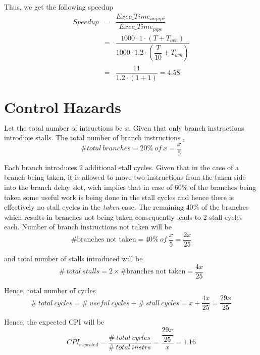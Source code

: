 \documentclass{tufte-handout}
\begin{document}
	Thus, we get the following speedup
	\begin{eqnarray*}
		Speedup &=& \dfrac{Exec\_Time_{unpipe}}{Exec\_Time_{pipe}} \\
		&=& \dfrac{1000 \cdot 1 \cdot (T + T_{ovh})}{1000 \cdot 1.2 \cdot (\dfrac{T}{10} + T_{ovh})} \\
		&=& \dfrac{11}{1.2 \cdot (1 + 1)} = \mathbf{4.58}
	\end{eqnarray*}

  \section{$\textbf{Control Hazards}$}
  Let the total number of intructions be $x$. Given that only branch instructions introduce stalls.
  The total number of branch instructions ,
  \[
  	\# total\ branches = 20\%\ of\ x = \dfrac{x}{5}
  \]

  Each branch introduces 2 additional stall cycles. Given that in the case of a branch being taken, it is allowed to move two instructions from the taken side into the branch delay slot, wich implies that in case of $60\%$ of the branches being taken some useful work is being done in the stall cycles and hence there is effectively no stall cycles in the \emph{taken} case. The remaining $40\%$ of the branches which results in branches not being taken consequently leads to 2 stall cycles each. 
  Number of branch instructions not taken will be
  \[
  	\mbox{\# branches not taken} = 40\%\ of\ \dfrac{x}{5} = \dfrac{2x}{25}
  \]

  and total number of stalls introduced will be
  \[
  	\#\ total\ stalls = 2 \times \mbox{\# branches not taken} = \dfrac{4x}{25}
  \]

  Hence, total number of cycles
  \[
  	 \#\ total\ cycles = \#\ useful\ cycles + \#\ stall\ cycles = x + \dfrac{4x}{25} = \dfrac{29x}{25}
  \]

  Hence, the expected CPI will be
  \[
  	CPI_{expected} = \dfrac{\#\ total\ cycles}{\#\ total\ instrs} = \dfrac{\dfrac{29x}{25}}{x} = \mathbf{1.16}
  \]
\end{document}
